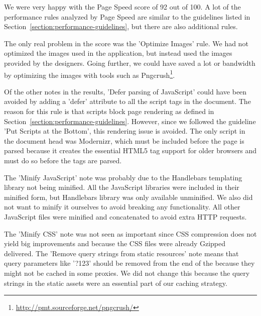 We were very happy with the Page Speed score of 92 out of 100. A lot
of the performance rules analyzed by Page Speed are similar to the
guidelines listed in Section~\ref{section:performance-guidelines}, but
there are also additional rules.

The only real problem in the score was the 'Optimize Images' rule. We
had not optimized the images used in the application, but instead used
the images provided by the designers. Going further, we could have
saved a lot or bandwidth by optimizing the images with tools such as
Pngcrush\footnote{\url{http://pmt.sourceforge.net/pngcrush/}}.

Of the other notes in the results, 'Defer parsing of JavaScript' could
have been avoided by adding a 'defer' attribute to all the script tags
in the document. The reason for this rule is that scripts block page
rendering as defined in
Section~\ref{section:performance-guidelines}. However, since we
followed the guideline 'Put Scripts at the Bottom', this rendering
issue is avoided. The only script in the document head was Modernizr,
which must be included before the page is parsed because it creates
the essential HTML5 tag support for older browsers and must do so
before the tags are parsed.

The 'Minify JavaScript' note was probably due to the Handlebars
templating library not being minified. All the JavaScript libraries
were included in their minified form, but Handlebars library was only
available unminified. We also did not want to minify it ourselves to
avoid breaking any functionality. All other JavaScript files were
minified and concatenated to avoid extra HTTP requests.

The 'Minify CSS' note was not seen as important since CSS compression
does not yield big improvements and because the CSS files were already
Gzipped delivered. The 'Remove query strings from static resources'
note means that query parameters like '?123' should be removed from
the end of the  because they might not be cached in some
proxies. We did not change this because the query strings in the
static assets were an essential part of our caching strategy.

